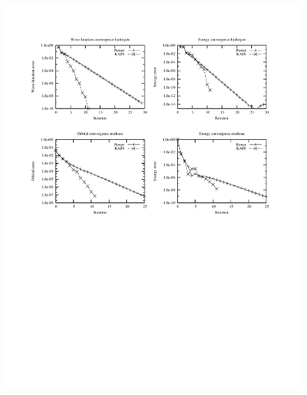 \begin{frame}
\begin{columns}
\begin{column}[b]{0.6\textwidth}
\begin{figure}
    \end{figure}
    \begin{figure}
	\includegraphics[scale=0.6, clip, viewport = 50 350 300 540]{figures/convergence.pdf}
    \end{figure}
    \end{column}
    \end{columns}
\end{frame}

